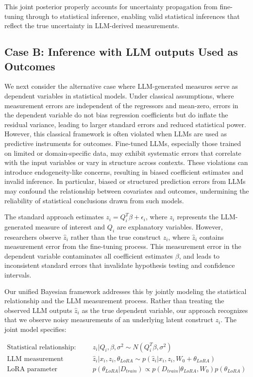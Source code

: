 \documentclass[11pt]{article}
\begin{document}
This joint posterior properly accounts for uncertainty propagation from fine-tuning through to statistical inference, enabling valid statistical inferences that reflect the true uncertainty in LLM-derived measurements.

\subsection{Case B: Inference with LLM outputs Used as Outcomes}

We next consider the alternative case where LLM-generated measures serve as dependent variables in statistical models. Under classical assumptions, where measurement errors are independent of the regressors and mean-zero, errors in the dependent variable do not bias regression coefficients but do inflate the residual variance, leading to larger standard errors and reduced statistical power. However, this classical framework is often violated when LLMs are used as predictive instruments for outcomes. Fine-tuned LLMs, especially those trained on limited or domain-specific data, may exhibit systematic errors that correlate with the input variables or vary in structure across contexts. These violations can introduce endogeneity-like concerns, resulting in biased coefficient estimates and invalid inference. In particular, biased or structured prediction errors from LLMs may confound the relationship between covariates and outcomes, undermining the reliability of statistical conclusions drawn from such models.

The standard approach estimates $z_i = Q_i^T\beta + \epsilon_i$, where $z_i$ represents the LLM-generated measure of interest and $Q_i$ are explanatory variables. However, researchers observe $\hat{z}_i$ rather than the true construct $z_i$, where $\hat{z}_i$ contains measurement error from the fine-tuning process. This measurement error in the dependent variable contaminates all coefficient estimates $\beta$, and leads to inconsistent standard errors that invalidate hypothesis testing and confidence intervals.

Our unified Bayesian framework addresses this by jointly modeling the statistical relationship and the LLM measurement process. Rather than treating the observed LLM outputs $\hat{z}_i$ as the true dependent variable, our approach recognizes that we observe noisy measurements of an underlying latent construct $z_i$. The joint model specifies:

\begin{align}
\text{Statistical relationship:} \quad &z_i|Q_i, \beta, \sigma^2 \sim N(Q_i^T\beta, \sigma^2) \label{eq:stat_relationship} \\
\text{LLM measurement process:} \quad &\hat{z}_i|x_i, z_i, \theta_{LoRA} \sim p(\hat{z}_i|x_i, z_i, W_0 + \theta_{LoRA}) \label{eq:llm_measurement} \\
\text{LoRA parameter posterior:} \quad &p(\theta_{LoRA}|D_{train}) \propto p(D_{train}|\theta_{LoRA}, W_0)p(\theta_{LoRA}) \label{eq:lora_posterior2}
\end{align}
\end{document}
